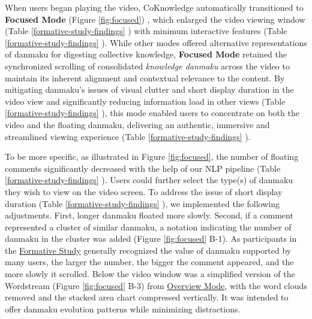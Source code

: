When users began playing the video, CoKnowledge automatically transitioned to \textbf{Focused Mode} (Figure \ref{fig:focused})
, which enlarged the video viewing window (Table \ref{formative-study-findings} ) with minimum interactive features (Table \ref{formative-study-findings} ). While other modes offered alternative representations of danmaku for digesting collective knowledge, \textbf{Focused Mode} retained the synchronized scrolling of consolidated \textit{knowledge danmaku} across the video to maintain its inherent alignment and contextual relevance to the content. By mitigating danmaku's issues of visual clutter and short display duration in the video view and significantly reducing information load in other views (Table \ref{formative-study-findings} ), this mode enabled users to concentrate on both the video and the floating danmaku,
delivering an authentic, immersive and streamlined viewing experience (Table \ref{formative-study-findings} ).




To be more specific, as illustrated in Figure \ref{fig:focused}, the number of floating comments significantly decreased with the help of our NLP pipeline (Table \ref{formative-study-findings} ). Users could further select the type(s) of danmaku they wish to view on the video screen. To address the issue of short display duration (Table \ref{formative-study-findings} ), we implemented the following adjustments. First, longer danmaku floated more slowly. Second, if a comment represented a cluster of similar danmaku, a notation indicating the number of danmaku in the cluster was added (Figure \ref{fig:focused} B-1).
As participants in the \hyperref[formative-study]{Formative Study} generally recognized the value of danmaku supported by many users, the larger the number, the bigger the comment appeared, and the more slowly it scrolled.
Below the video window was a simplified version of the Wordstream (Figure \ref{fig:focused} B-3) from \hyperref[overview-mode]{Overview Mode}, with the word clouds removed and the stacked area chart compressed vertically. It was intended to offer danmaku evolution patterns while minimizing distractions.


